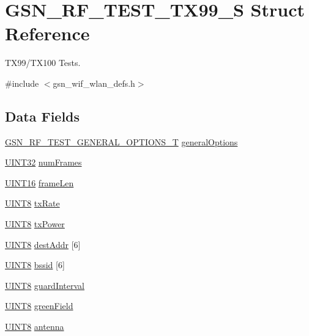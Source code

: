 \hypertarget{a00190}{
\section{GSN\_\-RF\_\-TEST\_\-TX99\_\-S Struct Reference}
\label{a00190}
}


TX99/TX100 Tests.  




{\ttfamily \#include $<$gsn\_\-wif\_\-wlan\_\-defs.h$>$}

\subsection*{Data Fields}
\begin{DoxyCompactItemize}
\item 
\hyperlink{a00188}{GSN\_\-RF\_\-TEST\_\-GENERAL\_\-OPTIONS\_\-T} \hyperlink{a00190_a5e4e9e8d2b76fbb6bdf201c4aeddd60d}{generalOptions}
\item 
\hyperlink{a00660_gae1e6edbbc26d6fbc71a90190d0266018}{UINT32} \hyperlink{a00190_a4e13c180765684684613fee7c7d86666}{numFrames}
\item 
\hyperlink{a00660_ga09f1a1fb2293e33483cc8d44aefb1eb1}{UINT16} \hyperlink{a00190_ad7d37183f86bdd7a3c11db21c3301b32}{frameLen}
\item 
\hyperlink{a00660_gab27e9918b538ce9d8ca692479b375b6a}{UINT8} \hyperlink{a00190_ab1ab70812caf37881581c451398a6f9c}{txRate}
\item 
\hyperlink{a00660_gab27e9918b538ce9d8ca692479b375b6a}{UINT8} \hyperlink{a00190_a763a8a049f451428e05835d3c3b466cd}{txPower}
\item 
\hyperlink{a00660_gab27e9918b538ce9d8ca692479b375b6a}{UINT8} \hyperlink{a00190_a8b13c9d995b3a022c8481b2e0c972ae0}{destAddr} \mbox{[}6\mbox{]}
\item 
\hyperlink{a00660_gab27e9918b538ce9d8ca692479b375b6a}{UINT8} \hyperlink{a00190_af1eb240ad4299a104d0bf3fddcabbb95}{bssid} \mbox{[}6\mbox{]}
\item 
\hyperlink{a00660_gab27e9918b538ce9d8ca692479b375b6a}{UINT8} \hyperlink{a00190_ab98fc9858671817369884eb76059060c}{guardInterval}
\item 
\hyperlink{a00660_gab27e9918b538ce9d8ca692479b375b6a}{UINT8} \hyperlink{a00190_a1616fda9db33a672fcd0096af9760f68}{greenField}
\item 
\hyperlink{a00660_gab27e9918b538ce9d8ca692479b375b6a}{UINT8} \hyperlink{a00190_ad84150bc4d20a5e841d834b269db9901}{antenna}
\item 

\end{DoxyCompactItemize}
